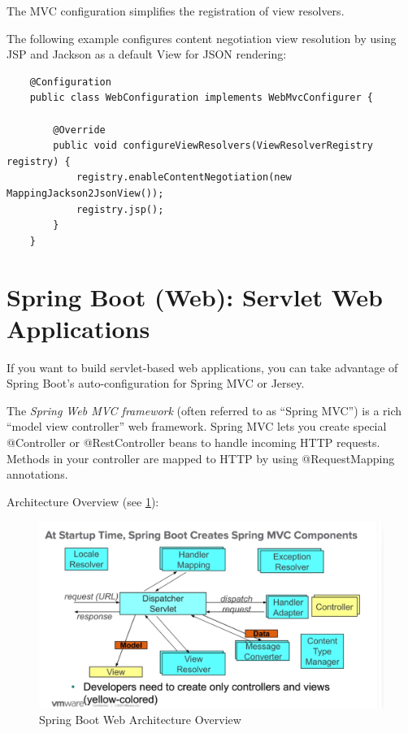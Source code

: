 \documentclass{scrartcl}
\begin{document}
The MVC configuration simplifies the registration of view resolvers.

The following example configures content negotiation view resolution by using JSP and Jackson as a default View for JSON rendering:

\begin{lstlisting}
    @Configuration
    public class WebConfiguration implements WebMvcConfigurer {

        @Override
        public void configureViewResolvers(ViewResolverRegistry registry) {
            registry.enableContentNegotiation(new MappingJackson2JsonView());
            registry.jsp();
        }
    }
\end{lstlisting}




\section{Spring Boot (Web): Servlet Web Applications}

If you want to build servlet-based web applications, you can take advantage of Spring Boot’s auto-configuration for Spring MVC or Jersey.

The \textit{Spring Web MVC framework} (often referred to as “Spring MVC”) is a rich “model view controller” web framework. Spring MVC lets you create special @Controller or @RestController beans to handle incoming HTTP requests. Methods in your controller are mapped to HTTP by using @RequestMapping annotations.

Architecture Overview (see \ref{fig:spring-web}):

\begin{figure}[h]
    \centering
    \includegraphics[width=1\linewidth]{spring-web}
    \caption{Spring Boot Web Architecture Overview}
    \label{fig:spring-web}
\end{figure}
\end{document}
